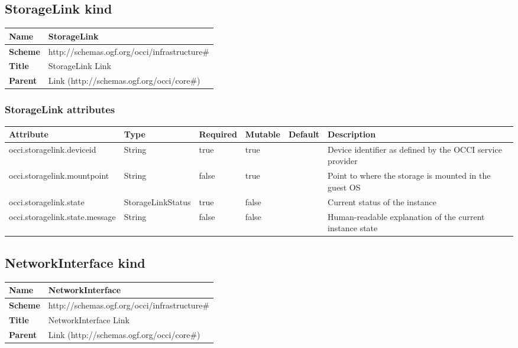 \documentclass{article}
\begin{document}
\subsection{StorageLink kind}
\begin{center}
\begin{tabular}{|l|l|}
  \hline
  \textbf{Name} & StorageLink \\
  \hline  
  \textbf{Scheme} & http://schemas.ogf.org/occi/infrastructure\# \\
  \hline
  \textbf{Title} & StorageLink Link \\
  \hline
  \textbf{Parent} & Link (http://schemas.ogf.org/occi/core\#) \\
  \hline
\end{tabular}
\end{center}
\subsubsection{StorageLink attributes}
\begin{tabularx}{\textwidth}{|l|l|p{1.4cm}|p{1.3cm}|l|X|}
  \hline
  \textbf{Attribute} & \textbf{Type} & \textbf{Required} & \textbf{Mutable} & \textbf{Default} & \textbf{Description} \\
  \hline  
  occi.storagelink.deviceid & String & true & true &  & Device identifier as defined by the OCCI service provider \\
  \hline
  occi.storagelink.mountpoint & String & false & true &  & Point to where the storage is mounted in the guest OS \\
  \hline
  occi.storagelink.state & StorageLinkStatus & true & false &  & Current status of the instance \\
  \hline
  occi.storagelink.state.message & String & false & false &  & Human-readable explanation of the current instance state \\
  \hline
\end{tabularx}


\subsection{NetworkInterface kind}
\begin{center}
\begin{tabular}{|l|l|}
  \hline
  \textbf{Name} & NetworkInterface \\
  \hline  
  \textbf{Scheme} & http://schemas.ogf.org/occi/infrastructure\# \\
  \hline
  \textbf{Title} & NetworkInterface Link \\
  \hline
  \textbf{Parent} & Link (http://schemas.ogf.org/occi/core\#) \\
  \hline
\end{tabular}
\end{center}
\end{document}
